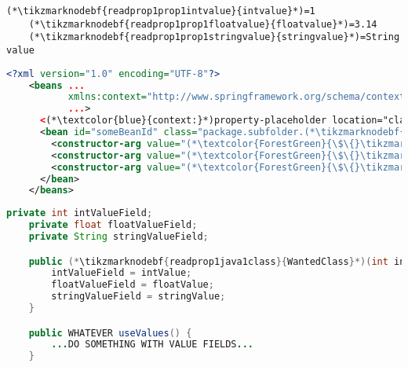 \begin{lstlisting}[title={A \path{.properties} file called \tikzmarknodebf{readprop1prop1filename}{\textit{constructor.properties}}}]
    (*\tikzmarknodebf{readprop1prop1intvalue}{intvalue}*)=1
    (*\tikzmarknodebf{readprop1prop1floatvalue}{floatvalue}*)=3.14
    (*\tikzmarknodebf{readprop1prop1stringvalue}{stringvalue}*)=String value
\end{lstlisting}
\begin{lstlisting}[language=XML, title={Configuration XML}]
    <?xml version="1.0" encoding="UTF-8"?>
    <beans ...
           xmlns:context="http://www.springframework.org/schema/context"
           ...>
      <(*\textcolor{blue}{context:}*)property-placeholder location="classpath:(*\tikzmarknodebf{readprop1xml1filename}{constructor.properties}[ForestGreen]*)" file-encoding="utf-8"/>
      <bean id="someBeanId" class="package.subfolder.(*\tikzmarknodebf{readprop1xml1class}{WantedClass}[ForestGreen]*)">
        <constructor-arg value="(*\textcolor{ForestGreen}{\$\{}\tikzmarknodebf{readprop1xml1intvalue}{intvalue}[ForestGreen]\textcolor{ForestGreen}{\}}*)"/>
        <constructor-arg value="(*\textcolor{ForestGreen}{\$\{}\tikzmarknodebf{readprop1xml1floatvalue}{floatvalue}[ForestGreen]\textcolor{ForestGreen}{\}}*)"/>
        <constructor-arg value="(*\textcolor{ForestGreen}{\$\{}\tikzmarknodebf{readprop1xml1stringvalue}{stringvalue}[ForestGreen]\textcolor{ForestGreen}{\}}*)"/>
      </bean>
    </beans>
\end{lstlisting}
\begin{lstlisting}[language=Java, title={Wanted class with the constructor}]
    private int intValueField;
    private float floatValueField;
    private String stringValueField;

    public (*\tikzmarknodebf{readprop1java1class}{WantedClass}*)(int intValue, float floatValue, String stringValue) {
        intValueField = intValue;
        floatValueField = floatValue;
        stringValueField = stringValue;
    }

    public WHATEVER useValues() {
        ...DO SOMETHING WITH VALUE FIELDS...
    }
\end{lstlisting}
\newpage

